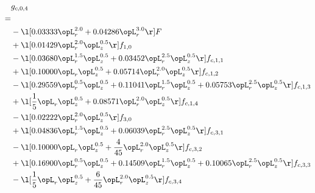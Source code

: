 \begin{alignat}{2} 
\label{eq:g_04_0} 
& g_{c,0,4} \nonumber \\ 
 = \\ 
& - \l[  0.03333 \opL_r^{2.0} +  0.04286 \opL_r^{3.0}  \r] F \nonumber \\ 
& + \l[  0.01429 \opL_r^{2.0} \opL_z^{0.5}  \r] f_{1,0} \nonumber \\ 
& - \l[  0.03680 \opL_r^{1.5} \opL_z^{0.5} +  0.03452 \opL_r^{2.5} \opL_z^{0.5}  \r] f_{c,1,1} \nonumber \\ 
& + \l[  0.10000 \opL_r \opL_z^{0.5} +  0.05714 \opL_r^{2.0} \opL_z^{0.5}  \r] f_{c,1,2} \nonumber \\ 
& - \l[  0.29559 \opL_r^{0.5} \opL_z^{0.5} +  0.11041 \opL_r^{1.5} \opL_z^{0.5} +  0.05753 \opL_r^{2.5} \opL_z^{0.5}  \r] f_{c,1,3} \nonumber \\ 
& + \l[ \frac{1}{5} \opL_r \opL_z^{0.5} +  0.08571 \opL_r^{2.0} \opL_z^{0.5}  \r] f_{c,1,4} \nonumber \\ 
& - \l[  0.02222 \opL_r^{2.0} \opL_z^{0.5}  \r] f_{3,0} \nonumber \\ 
& + \l[  0.04836 \opL_r^{1.5} \opL_z^{0.5} +  0.06039 \opL_r^{2.5} \opL_z^{0.5}  \r] f_{c,3,1} \nonumber \\ 
& - \l[  0.10000 \opL_r \opL_z^{0.5} + \frac{4}{45} \opL_r^{2.0} \opL_z^{0.5}  \r] f_{c,3,2} \nonumber \\ 
& + \l[  0.16900 \opL_r^{0.5} \opL_z^{0.5} +  0.14509 \opL_r^{1.5} \opL_z^{0.5} +  0.10065 \opL_r^{2.5} \opL_z^{0.5}  \r] f_{c,3,3} \nonumber \\ 
& - \l[ \frac{1}{5} \opL_r \opL_z^{0.5} + \frac{6}{45} \opL_r^{2.0} \opL_z^{0.5}  \r] f_{c,3,4} \nonumber \\ 
\end{alignat} 


